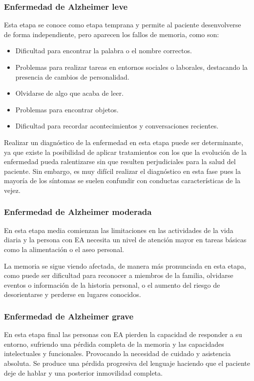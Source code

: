 \subsubsection{Enfermedad de Alzheimer leve}\label{subsubsec:etapa-temprana-EA}
Esta etapa se conoce como etapa temprana y permite al paciente desenvolverse de forma independiente, pero aparecen los
fallos de memoria, como son:
\begin{itemize}
    \item Dificultad para encontrar la palabra o el nombre correctos.
    \item Problemas para realizar tareas en entornos sociales o laborales, destacando la presencia de cambios de
    personalidad.
    \item Olvidarse de algo que acaba de leer.
    \item Problemas para encontrar objetos.
    \item Dificultad para recordar acontecimientos y conversaciones recientes.\\
\end{itemize}

Realizar un diagnóstico de la enfermedad en esta etapa puede ser determinante, ya que existe la posibilidad de aplicar
tratamientos con los que la evolución de la enfermedad pueda ralentizarse sin que resulten perjudiciales para la salud
del paciente.
Sin embargo, es muy difícil realizar el diagnóstico en esta fase pues la mayoría de los síntomas se suelen confundir con
conductas características de la vejez.

\subsubsection{Enfermedad de Alzheimer moderada}\label{subsubsec:etapa-media-EA}
En esta etapa media comienzan las limitaciones en las actividades de la vida diaria y la persona con EA necesita un
nivel de atención mayor en tareas básicas como la alimentación o el aseo personal.

La memoria se sigue viendo afectada, de manera más pronunciada en esta etapa, como puede ser dificultad para reconocer a
miembros de la familia, olvidarse eventos o información de la historia personal, o el aumento del riesgo de
desorientarse y perderse en lugares conocidos.

\subsubsection{Enfermedad de Alzheimer grave}\label{subsubsec:etapa-final-EA}
En esta etapa final las personas con EA pierden la capacidad de responder a su entorno, sufriendo una pérdida completa
de la memoria y las capacidades intelectuales y funcionales.
Provocando la necesidad de cuidado y asistencia absoluta.
Se produce una pérdida progresiva del lenguaje haciendo que el paciente deje de hablar y una posterior inmovilidad
completa.

